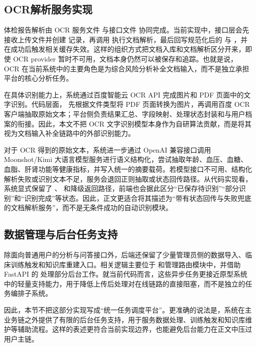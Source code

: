 \subsection{OCR解析服务实现}

体检报告解析由 OCR 服务文件  与接口文件  协同完成。当前实现中，接口层会先接收上传文件并创建  记录，再调用  执行文档解析，最后回写规范化后的  与 ，并在成功后触发相关缓存失效。这样的组织方式把文档入库和文档解析区分开来，即使 OCR provider 暂时不可用，文档本身仍然可以被保存和追踪。也就是说，OCR 在当前系统中的主要角色是为综合风险分析补全文档输入，而不是独立承担平台的核心分析任务。

在具体识别能力上，系统通过百度智能云 OCR API 完成图片和 PDF 页面中的文字识别。代码层面， 先根据文件类型将 PDF 页面转换为图片，再调用百度 OCR 客户端抽取原始文本；平台侧负责结果汇总、字段映射、处理状态封装和与用户档案的衔接。因此，本文不把 OCR 文字识别模型本身作为自研算法贡献，而是将其视为文档输入补全链路中的外部识别能力。

对于 OCR 得到的原始文本，系统进一步通过 OpenAI 兼容接口调用 Moonshot/Kimi 大语言模型服务进行语义结构化，尝试抽取年龄、血压、血糖、血脂、肝肾功能等健康指标，并写入统一的摘要载荷。若模型接口不可用、结构化解析失败或识别文本不足，服务会退回正则抽取或状态回传路径。从代码实现看，系统显式保留了 、 和降级返回路径，前端也会据此区分“已保存待识别”“部分识别”和“识别完成”等状态。因此，正文更适合将其描述为“带有状态回传与失败兜底的文档解析服务”，而不是无条件成功的自动识别模块。

\subsection{数据管理与后台任务支持}

除面向普通用户的分析与问答接口外，后端还保留了少量管理员侧的数据导入、临床训练触发和知识库重建入口。相关逻辑主要位于  和管理路由模块中，并借助 FastAPI 的  处理部分后台工作。就当前代码而言，这些异步任务更接近原型系统中的轻量支持能力，用于降低上传后处理对在线链路的直接阻塞，而不是独立的任务编排子系统。

因此，本节不把这部分实现写成“统一任务调度平台”。更准确的说法是，系统在主业务链之外提供了有限的后台任务支持，用于服务数据处理、训练触发和知识库维护等辅助流程。这样的表述更符合当前实现边界，也能避免后台能力在正文中压过用户主链。

